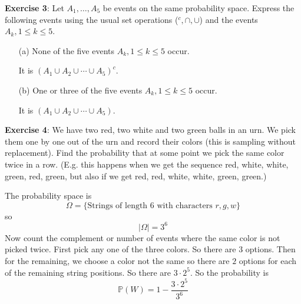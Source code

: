 \documentclass{article}
\begin{document}
\newpage

\textbf{Exercise 3}: Let $A_{1}, \ldots, A_{5}$ be events on the same probability space. Express the following events using the usual set operations (${}^{c}, \cap, \cup$) and the events $A_{k}, 1 \leq k \leq 5$.
    \begin{itemize}
        \item [(a)] None of the five events $A_{k}, 1 \leq k \leq 5$ occur.
            \begin{answer}
                It is $(A_{1} \cup A_{2} \cup \cdots \cup A_{5})^{c}$.
            \end{answer}

        \item [(b)] One or three of the five events $A_{k}, 1 \leq k \leq 5$ occur.
            \begin{answer}
                It is $(A_{1} \cup A_{2} \cup \cdots \cup A_{5})$.
            \end{answer}
    \end{itemize}

\newpage

\textbf{Exercise 4}: We have two red, two white and two green balls in an urn. We pick them one by one out of the urn and record their colors (this is sampling without replacement). Find the probability that at some point we pick the same color twice in a row. (E.g. this happens when we get the sequence red, white, white, green, red, green, but also if we get red, red, white, white, green, green.)
    \begin{answer}
        The probability space is 
            \begin{equation*}
                \Omega = \{\text{Strings of length $6$ with characters $r, g, w$}\}
            \end{equation*}
        so
            \begin{equation*}
                \lvert \Omega \rvert = 3^{6}
            \end{equation*}
        Now count the complement or number of events where the same color is not picked twice. First pick any one of the three colors. So there are $3$ options. Then for the remaining, we choose a color not the same so there are $2$ options for each of the remaining string positions. So there are $3 \cdot 2^{5}$. So the probability is
            \begin{equation*}
                \mathbb{P}(W) = 1 - \dfrac{3 \cdot 2^{5}}{3^{6}}
            \end{equation*}
    \end{answer}
\end{document}
